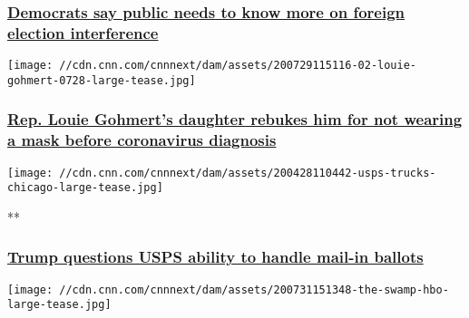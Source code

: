 \hypertarget{democrats-say-public-needs-to-know-more-on-foreign-election-interference}{%
\subsubsection{\texorpdfstring{\href{/2020/08/03/politics/foreign-election-interference-senate/index.html}{Democrats
say public needs to know more on foreign election
interference}}{Democrats say public needs to know more on foreign election interference}}\label{democrats-say-public-needs-to-know-more-on-foreign-election-interference}}

\href{/2020/08/03/politics/louie-gohmert-daughter-masks-coronavirus/index.html}{}

\texttt{[image: //cdn.cnn.com/cnnnext/dam/assets/200729115116-02-louie-gohmert-0728-large-tease.jpg]}

\hypertarget{rep-louie-gohmerts-daughter-rebukes-him-for-not-wearing-a-mask-before-coronavirus-diagnosis}{%
\subsubsection{\texorpdfstring{\href{/2020/08/03/politics/louie-gohmert-daughter-masks-coronavirus/index.html}{Rep.
Louie Gohmert's daughter rebukes him for not wearing a mask before
coronavirus
diagnosis}}{Rep. Louie Gohmert's daughter rebukes him for not wearing a mask before coronavirus diagnosis}}\label{rep-louie-gohmerts-daughter-rebukes-him-for-not-wearing-a-mask-before-coronavirus-diagnosis}}

\href{/videos/politics/2020/08/03/trump-briefing-usps-sot-acosta-bts-vpx.cnn}{}

\texttt{[image: //cdn.cnn.com/cnnnext/dam/assets/200428110442-usps-trucks-chicago-large-tease.jpg]}

**

\hypertarget{trump-questions-usps-ability-to-handle-mail-in-ballots}{%
\subsubsection{\texorpdfstring{\href{/videos/politics/2020/08/03/trump-briefing-usps-sot-acosta-bts-vpx.cnn}{Trump
questions USPS ability to handle mail-in
ballots}}{Trump questions USPS ability to handle mail-in ballots}}\label{trump-questions-usps-ability-to-handle-mail-in-ballots}}

\href{/2020/08/03/entertainment/the-swamp-review/index.html}{}

\texttt{[image: //cdn.cnn.com/cnnnext/dam/assets/200731151348-the-swamp-hbo-large-tease.jpg]}

